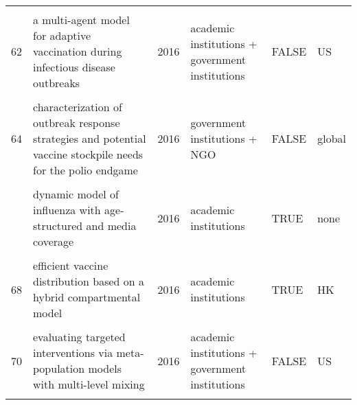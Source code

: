 \documentclass[
]{article}
\begin{document}
\begin{landscape}
\begin{longtable}{l>{\raggedright\arraybackslash}p{4cm}l>{\raggedright\arraybackslash}p{3.5cm}l>{\raggedright\arraybackslash}p{1.5cm}}
\addlinespace
\cellcolor{gray!6}{61} & \cellcolor{gray!6}{a mathematical model of ebola virus disease: using sensitivity analysis to determine effective intervention targets} & \cellcolor{gray!6}{2016} & \cellcolor{gray!6}{academic institutions} & \cellcolor{gray!6}{TRUE} & \cellcolor{gray!6}{none}\\
62 & a multi-agent model for adaptive vaccination during infectious disease outbreaks & 2016 & academic institutions + government institutions & FALSE & US\\
\cellcolor{gray!6}{63} & \cellcolor{gray!6}{assessing the efficiency of movement restriction as a control strategy of ebola} & \cellcolor{gray!6}{2016} & \cellcolor{gray!6}{academic institutions} & \cellcolor{gray!6}{TRUE} & \cellcolor{gray!6}{none}\\
64 & characterization of outbreak response strategies and potential vaccine stockpile needs for the polio endgame & 2016 & government institutions + NGO & FALSE & global\\
\cellcolor{gray!6}{65} & \cellcolor{gray!6}{designing public health policies to mitigate the adverse consequences of rural-urban migration via meta-population modeling} & \cellcolor{gray!6}{2016} & \cellcolor{gray!6}{academic institutions} & \cellcolor{gray!6}{TRUE} & \cellcolor{gray!6}{none}\\
\addlinespace
66 & dynamic model of influenza with age-structured and media coverage & 2016 & academic institutions & TRUE & none\\
\cellcolor{gray!6}{67} & \cellcolor{gray!6}{economic evaluation of individual school closure strategies: the hong kong 2009 h1n1 pandemic} & \cellcolor{gray!6}{2016} & \cellcolor{gray!6}{academic institutions} & \cellcolor{gray!6}{TRUE} & \cellcolor{gray!6}{HK}\\
68 & efficient vaccine distribution based on a hybrid compartmental model & 2016 & academic institutions & TRUE & HK\\
\cellcolor{gray!6}{69} & \cellcolor{gray!6}{epidemiological evaluation of different fmd control strategies in two selected regions in austria} & \cellcolor{gray!6}{2016} & \cellcolor{gray!6}{academic institutions + government institutions} & \cellcolor{gray!6}{FALSE} & \cellcolor{gray!6}{AT}\\
70 & evaluating targeted interventions via meta-population models with multi-level mixing & 2016 & academic institutions + government institutions & FALSE & US\\
\addlinespace
\cellcolor{gray!6}{71} & \cellcolor{gray!6}{evaluation of outbreak response immunization in the control of pertussis using agent-based modeling} & \cellcolor{gray!6}{2016} & \cellcolor{gray!6}{academic institutions} & \cellcolor{gray!6}{TRUE} & \cellcolor{gray!6}{CA}\\

\end{longtable}
\end{landscape}
\end{document}
